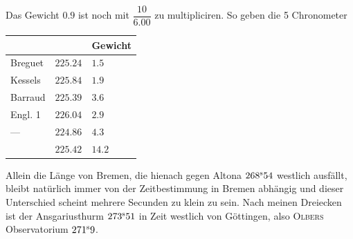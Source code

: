 Das Gewicht $0.9$ ist noch mit $\dfrac{10}{6.00}$ zu multipliciren. So geben die 5 Chronometer

\begin{center}
\begin{tabular}{l|l|l}
 & & Gewicht \\
\hline
Breguet & $225.24$ & $1.5$ \\
Kessels & $225.84$ & $1.9$ \\
Barraud & $225.39$ & $3.6$ \\
Engl. 1 & $226.04$ & $2.9$ \\
---\quad 4 & $224.86$ & $4.3$ \\
\hline
 & $225.42$ & $14.2$ \\
\end{tabular}
\end{center}

Allein die Länge von Bremen, die hienach gegen Altona $268^{\rm s}54$ westlich ausfällt, bleibt natürlich immer von der Zeitbestimmung in Bremen abhängig und dieser Unterschied scheint mehrere Secunden zu klein zu sein. Nach meinen Dreiecken ist der Ansgariusthurm $273^{\rm s}51$ in Zeit westlich von
Göttingen, also \textsc{Olbers} Observatorium $271^{\rm s}9$.
